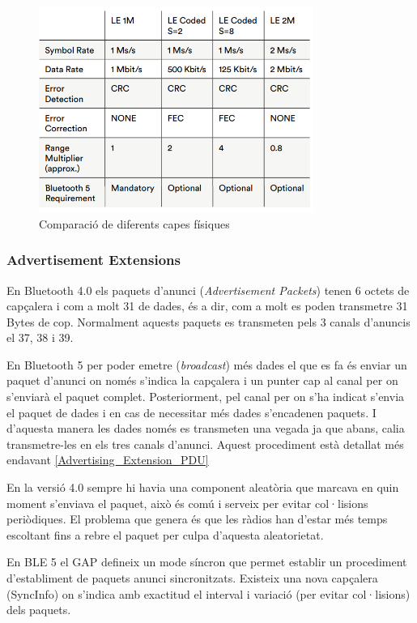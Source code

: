 \begin{figure}[h!]
	\begin{center}
		\includegraphics[width=0.8\textwidth]{./images/LE_PHY.png}
		\caption{Comparació de diferents capes físiques}
	\end{center}
\end{figure}

\subsubsection{Advertisement Extensions}
En Bluetooth 4.0 els paquets d'anunci (\textit{Advertisement Packets}) tenen 6 octets de capçalera i com a molt 31 de dades, és a dir, com a molt es poden transmetre 31 Bytes de cop.
Normalment aquests paquets es transmeten pels 3 canals d'anuncis el 37, 38 i 39.

En Bluetooth 5 per poder emetre (\textit{broadcast}) més dades el que es fa és enviar un paquet d'anunci on només s'indica la capçalera i un punter cap al canal per on s'enviarà el paquet complet.
Posteriorment, pel canal per on s'ha indicat s'envia el paquet de dades i en cas de necessitar més dades s'encadenen paquets.
I d'aquesta manera les dades només es transmeten una vegada ja que abans, calia transmetre-les en els tres canals d'anunci.
Aquest procediment està detallat més endavant \ref{Advertising_Extension_PDU}

En la versió 4.0 sempre hi havia una component aleatòria que marcava en quin moment s'enviava el paquet, això és comú i serveix per evitar col·lisions periòdiques.
El problema que genera és que les ràdios han d'estar més temps escoltant fins a rebre el paquet per culpa d'aquesta aleatorietat.

En BLE 5 el GAP defineix un mode síncron que permet establir un procediment d'establiment de paquets anunci sincronitzats.
Existeix una nova capçalera (SyncInfo) on s'indica amb exactitud el interval i variació (per evitar col·lisions) dels paquets.    

